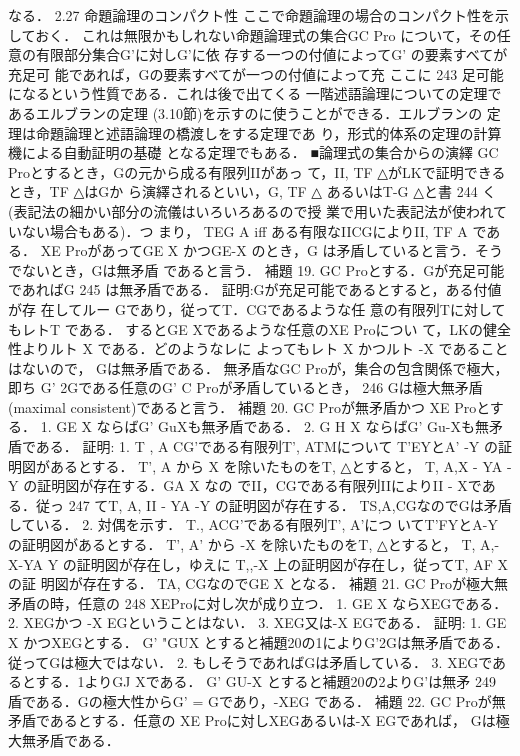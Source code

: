 \documentclass{ltjsarticle}
\theoremstyle{mystyle1}
\theoremstyle{mystyle3}
\theoremstyle{mystyle2}
\begin{document}
なる．
2.27 命題論理のコンパクト性 ここで命題論理の場合のコンパクト性を示しておく． これは無限かもしれない命題論理式の集合GC Pro について，その任意の有限部分集合G'に対しG'に依 存する一つの付値によってG' の要素すべてが充足可 能であれば，Gの要素すべてが一つの付値によって充
ここに
243
足可能になるという性質である．これは後で出てくる 一階述語論理についての定理であるエルブランの定理 (3.10節)を示すのに使うことができる．エルブランの 定理は命題論理と述語論理の橋渡しをする定理であ
り，形式的体系の定理の計算機による自動証明の基礎 となる定理でもある．
■論理式の集合からの演繹
GC Proとするとき，Gの元から成る有限列IIがあっ て，II, TF △がLKで証明できるとき，TF △はGか ら演繹されるといい，G, TF △ あるいはT-G △と書
244
く (表記法の細かい部分の流儀はいろいろあるので授 業で用いた表記法が使われていない場合もある)．つ まり，
TEG A iff ある有限なIICGによりII, TF A
である． XE ProがあってGE X かつGE-X のとき，G は矛盾していると言う．そうでないとき，Gは無矛盾 であると言う．
補題 19. GC Proとする．Gが充足可能であればG
245
は無矛盾である．
証明:Gが充足可能であるとすると，ある付値が存 在してルー Gであり，従ってT．CGであるような任 意の有限列Tに対してもレトT である． するとGE Xであるような任意のXE Proについ
て，LKの健全性よりルト X である．どのようなレに よってもレト X かつルト -X であることはないので， Gは無矛盾である．
無矛盾なGC Proが，集合の包含関係で極大，即ち G' 2Gである任意のG' C Proが矛盾しているとき，
246
Gは極大無矛盾 (maximal consistent)であると言う．
補題 20. GC Proが無矛盾かつ XE Proとする． 1. GE X ならばG' Gu{X}も無矛盾である． 2. G H X ならばG' Gu{-X}も無矛盾である．
証明: 1. T , A CG'である有限列T', ATMについて T'EYとA' -Y の証明図があるとする． T', A から X を除いたものをT, △とすると， T, A,X - YA -Y の証明図が存在する．GA X なの でII，CGである有限列IIによりII - Xである．従っ
247
てT, A, II - YA -Y の証明図が存在する． TS,A,CGなのでGは矛盾している． 2. 対偶を示す． T., ACG'である有限列T', A'につ いてT'FYとA-Y の証明図があるとする． T', A' から -X を除いたものをT, △とすると， T, A,-X-YA Y の証明図が存在し，ゆえに T,,-X 上の証明図が存在し，従ってT, AF X の証 明図が存在する． TA, CGなのでGE X となる．
補題 21. GC Proが極大無矛盾の時，任意の
248
XEProに対し次が成り立つ． 1. GE X ならXEGである． 2. XEGかつ -X EGということはない． 3. XEG又は-X EGである．
証明: 1. GE X かつXEGとする． G' "GU{X} とすると補題20の1によりG'2Gは無矛盾である． 従ってGは極大ではない． 2. もしそうであればGは矛盾している． 3. XEGであるとする．1よりGJ Xである． G' GU{-X} とすると補題20の2よりG'は無矛
249
盾である．Gの極大性からG' = Gであり，-XEG である．
補題 22. GC Proが無矛盾であるとする．任意の XE Proに対しXEGあるいは-X EGであれば， Gは極大無矛盾である．
\end{document}

